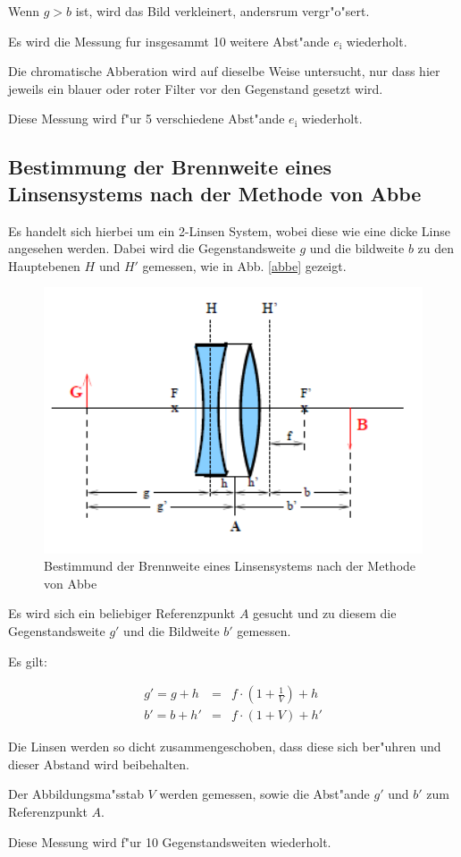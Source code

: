 		Wenn $g > b$ ist, wird das Bild verkleinert, andersrum vergr"o"sert.

		Es wird die Messung fur insgesammt 10 weitere Abst"ande $e_\mathrm{i}$ wiederholt.

		Die chromatische Abberation wird auf dieselbe Weise untersucht, nur dass hier jeweils ein blauer oder roter Filter vor den Gegenstand gesetzt wird.

		Diese Messung wird f"ur 5 verschiedene Abst"ande $e_\mathrm{i}$ wiederholt.

	\subsection{Bestimmung der Brennweite eines Linsensystems nach der Methode von Abbe} %
		\label{sub:bestimmung_der_brennweite_eines_linsensystems_nach_der_methode_von_abbe}

		Es handelt sich hierbei um ein 2-Linsen System, wobei diese wie eine dicke Linse angesehen werden.
		Dabei wird die Gegenstandsweite $g$ und die bildweite $b$ zu den Hauptebenen $H$ und $H'$ gemessen, wie in Abb. \eqref{abbe} gezeigt.

		\begin{figure}[htbp]
			\centering
			\includegraphics[width = 12cm]{img/abbe.PNG}
			\caption{Bestimmund der Brennweite eines Linsensystems nach der Methode von Abbe}
			\label{abbe}
		\end{figure}

		Es wird sich ein beliebiger Referenzpunkt $A$ gesucht und zu diesem die Gegenstandsweite $g'$ und die Bildweite $b'$ gemessen.

		Es gilt:

		\begin{eqnarray*}
			g' = g+h &=& f \cdot \left( 1 + \frac{1}{V} \right) + h \\
			b' = b+h' &=& f \cdot (1 + V) + h'
		\end{eqnarray*}

		Die Linsen werden so dicht zusammengeschoben, dass diese sich ber"uhren und dieser Abstand wird beibehalten.

		Der Abbildungsma"sstab $V$ werden gemessen, sowie die Abst"ande $g'$ und $b'$ zum Referenzpunkt $A$.

		Diese Messung wird f"ur 10 Gegenstandsweiten wiederholt.